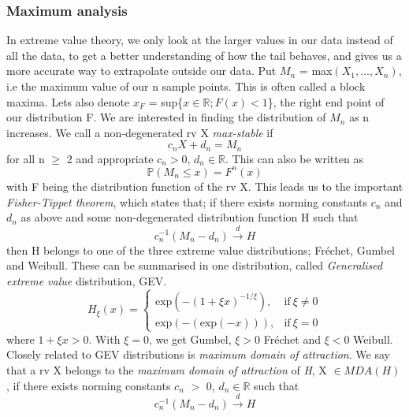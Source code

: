 \documentclass{article}
\begin{document}
		\subsubsection{Maximum analysis}
		In extreme value theory, we only look at the larger values in our data instead of all the data, to get a better understanding of how the tail behaves, and gives us a more accurate way to extrapolate outside our data. Put $M_n$ = max$(X_1,...,X_n)$, i.e the maximum value of our n sample points. This is often called a block maxima. Lets also denote $x_F$ = sup\{$x\in\mathbb{R} ; F(x)<1$\}, the right end point of our distribution F. We are interested in finding the distribution of $M_n$ as n increases. We call a non-degenerated rv X \textit{max-stable} if
		\begin{equation}
		c_nX + d_n = M_n
		\end{equation}
		for all n $\geq$ 2 and appropriate $c_n>0$, $d_n \in \mathbb{R}$. This can also be written as
		\begin{equation}
		\mathbb{P}(M_n \leq x) = F^n(x)
		\end{equation}
		with F being the distribution function of the rv X. This leads us to the important \textit{Fisher-Tippet theorem}, which states that; if there exists norming constants $c_n$ and $d_n$ as above and some non-degenerated distribution function H such that
		\begin{equation}
		c_n^{-1}(M_n - d_n) \xrightarrow{d} H
		\end{equation}
		then H belongs to one of the three extreme value distributions; Fr\'{e}chet, Gumbel and Weibull. These can be summarised in one distribution, called \textit{Generalised extreme value} distribution, GEV. 
		\begin{equation}
		H_\xi(x) = 
			\begin{cases}
				\text{exp}(-(1+\xi x)^{-1/\xi}), & \text{if} \ \xi \neq 0 \\
				\text{exp}(-(\text{exp}(-x))), & \text{if} \ \xi = 0 
		\end{cases}
		\end{equation}
		where $1+\xi x > 0$. With $\xi = 0$, we get Gumbel, $\xi > 0$ Fr\'{e}chet and $\xi < 0$ Weibull. Closely related to GEV distributions is \textit{maximum domain of attraction}. We say that a rv X belongs to the \textit{maximum domain of attraction} of \textit{H}, X $\in MDA(H)$, if there exists norming constants $c_n$ $>$ 0, $d_n \in \mathbb{R}$ such that
		\begin{equation}
			c_n^{-1}(M_n - d_n) \xrightarrow{d} H
		\end{equation}
		
\end{document}
